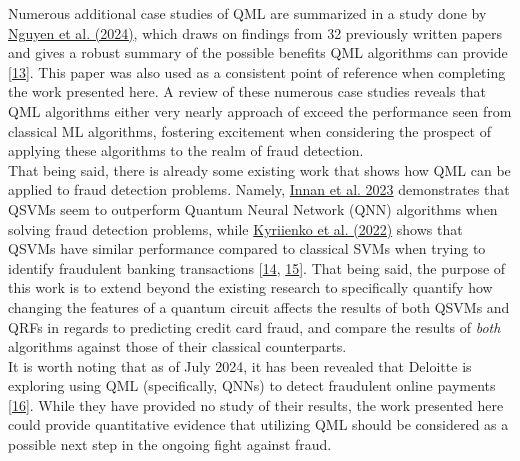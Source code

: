 \documentclass[11pt, oneside]{article}   	%
\begin{document}
Numerous additional case studies of QML are summarized in a study done by \href{https://doi.org/10.34190/eccws.23.1.2258}{Nguyen et al. (2024)}, which draws on findings from 32 previously written papers and gives a robust summary of the possible benefits QML algorithms can provide [\href{https://doi.org/10.34190/eccws.23.1.2258}{13}]. This paper was also used as a consistent point of reference when completing the work presented here. A review of these numerous case studies reveals that QML algorithms either very nearly approach of exceed the performance seen from classical ML algorithms, fostering excitement when considering the prospect of applying these algorithms to the realm of fraud detection. \\

\noindent\hspace{10mm}That being said, there is already some existing work that shows how QML can be applied to fraud detection problems. Namely, \href{https://doi.org/10.1142/S0219749923500442}{Innan et al. 2023} demonstrates that QSVMs seem to outperform Quantum Neural Network (QNN) algorithms when solving fraud detection problems, while \href{https://arxiv.org/abs/2208.01203}{Kyriienko et al. (2022)} shows that QSVMs have similar performance compared to classical SVMs when trying to identify fraudulent banking transactions [\href{https://doi.org/10.1142/S0219749923500442}{14}, \href{https://doi.org/10.48550/arXiv.2208.01203}{15}]. That being said, the purpose of this work is to extend beyond the existing research to specifically quantify how changing the features of a quantum circuit affects the results of both QSVMs and QRFs in regards to predicting credit card fraud, and compare the results of \textit{both} algorithms against those of their classical counterparts.\\

\noindent\hspace{10mm}It is worth noting that as of July 2024, it has been revealed that Deloitte is exploring using QML (specifically, QNNs) to detect fraudulent online payments [\href{https://thequantuminsider.com/2024/07/19/deloitte-italy-explores-quantum-machine-learning-for-digital-payments-fraud-detection/}{16}]. While they have provided no study of their results, the work presented here could provide quantitative evidence that utilizing QML should be considered as a possible next step in the ongoing fight against fraud. 


\end{document}
